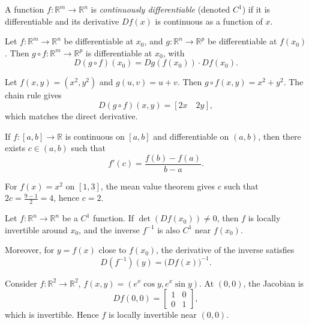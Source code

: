\begin{definition}
A function $f:\mathbb{R}^m\to \mathbb{R}^n$ is \emph{continuously differentiable} (denoted $C^1$) if it is differentiable and its derivative $Df(x)$ is continuous as a function of $x$.
\end{definition}

\begin{proposition}
Let $f:\mathbb{R}^m\to \mathbb{R}^n$ be differentiable at $x_0$, and $g:\mathbb{R}^n\to \mathbb{R}^p$ be differentiable at $f(x_0)$.  
Then $g\circ f:\mathbb{R}^m\to \mathbb{R}^p$ is differentiable at $x_0$, with
\[
D(g\circ f)(x_0) = Dg(f(x_0)) \cdot Df(x_0).
\]
\end{proposition}

\begin{example}
Let $f(x,y)=(x^2,y^2)$ and $g(u,v)=u+v$. Then $g\circ f(x,y)=x^2+y^2$.  
The chain rule gives
\[
D(g\circ f)(x,y)= [2x \quad 2y],
\]
which matches the direct derivative.
\end{example}

\begin{theorem}
If $f:[a,b]\to \mathbb{R}$ is continuous on $[a,b]$ and differentiable on $(a,b)$, then there exists $c\in (a,b)$ such that
\[
f'(c) = \frac{f(b)-f(a)}{b-a}.
\]
\end{theorem}

\begin{example}
For $f(x)=x^2$ on $[1,3]$, the mean value theorem gives $c$ such that $2c=\frac{9-1}{2}=4$, hence $c=2$.
\end{example}

\begin{theorem}
Let $f:\mathbb{R}^n\to \mathbb{R}^n$ be a $C^1$ function.  
If $\det(Df(x_0))\neq 0$, then $f$ is locally invertible around $x_0$, and the inverse $f^{-1}$ is also $C^1$ near $f(x_0)$.  

Moreover, for $y=f(x)$ close to $f(x_0)$, the derivative of the inverse satisfies
\[
D(f^{-1})(y) = \big(Df(x)\big)^{-1}.
\]
\end{theorem}


\begin{example}
Consider $f:\mathbb{R}^2\to \mathbb{R}^2$, $f(x,y)=(e^x \cos y, e^x \sin y)$.  
At $(0,0)$, the Jacobian is 
\[
Df(0,0)=\begin{bmatrix}1&0\\0&1\end{bmatrix},
\]
which is invertible. Hence $f$ is locally invertible near $(0,0)$.
\end{example}

